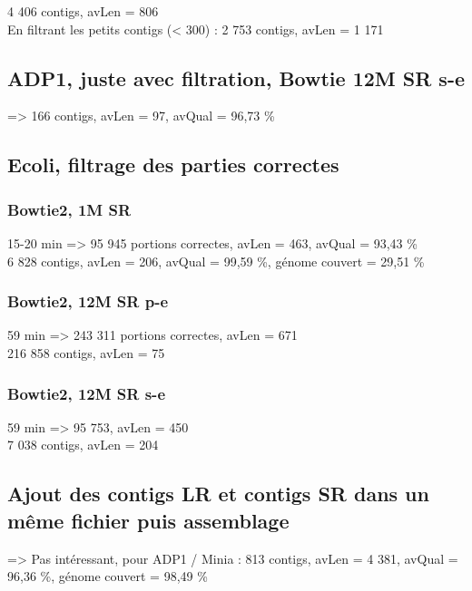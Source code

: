 \documentclass[12pt]{article}
\begin{document}
4 406 contigs, avLen = 806 \\

En filtrant les petits contigs (< 300) : 2 753 contigs, avLen = 1 171

\subsection{ADP1, juste avec filtration, Bowtie 12M SR s-e}

=> 166 contigs, avLen = 97, avQual = 96,73 \%

\subsection{Ecoli, filtrage des parties correctes}

\subsubsection{Bowtie2, 1M SR}

15-20 min => 95 945 portions correctes, avLen = 463, avQual = 93,43 \% \\

6 828 contigs, avLen = 206, avQual = 99,59 \%, génome couvert = 29,51 \%

\subsubsection{Bowtie2, 12M SR p-e}

59 min => 243 311 portions correctes, avLen = 671 \\

216 858 contigs, avLen = 75 \\

\subsubsection{Bowtie2, 12M SR s-e}

59 min => 95 753, avLen = 450 \\

7 038 contigs, avLen = 204


\subsection{Ajout des contigs LR et contigs SR dans un même fichier puis assemblage}

=> Pas intéressant, pour ADP1 / Minia : 813 contigs, avLen = 4 381, avQual = 96,36 \%, génome couvert = 98,49 \%
\end{document}
